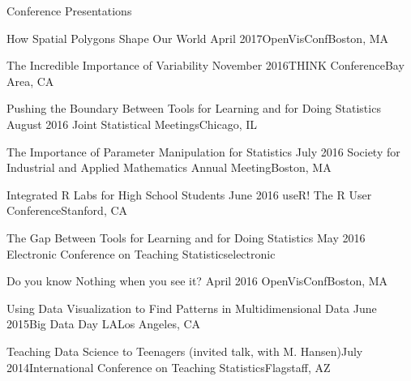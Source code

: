 \documentclass{resume} %
\begin{document}
\begin{rSection}{Conference Presentations}
\begin{sSubsection}{How Spatial Polygons Shape Our World}{ }{April 2017}{OpenVisConf}{Boston, MA}
\end{sSubsection}

\begin{sSubsection}{The Incredible Importance of Variability}{ }{November 2016}{THINK Conference}{Bay Area, CA}
\end{sSubsection}

\begin{sSubsection}{Pushing the Boundary Between Tools for Learning and for Doing Statistics}{ }{August 2016 }{Joint Statistical Meetings}{Chicago, IL}
\end{sSubsection}

\begin{sSubsection}{The Importance of Parameter Manipulation for Statistics}{ }{July 2016 }{Society for Industrial and Applied Mathematics Annual Meeting}{Boston, MA}
\end{sSubsection}

\begin{sSubsection}{Integrated R Labs for High School Students}{ }{June 2016 }{useR! The R User Conference}{Stanford, CA}
\end{sSubsection}

\begin{sSubsection}{The Gap Between Tools for Learning and for Doing Statistics}{ }{May 2016 }{Electronic Conference on Teaching Statistics}{electronic}
\end{sSubsection}

\begin{sSubsection}{Do you know Nothing when you see it?}{ }{April 2016 }{OpenVisConf}{Boston, MA}
\end{sSubsection}

\begin{sSubsection}{Using Data Visualization to Find Patterns in Multidimensional Data}{ }{June 2015}{Big Data Day LA}{Los Angeles, CA}
\end{sSubsection}

\begin{sSubsection}{Teaching Data Science to Teenagers}{ (invited talk, with M. Hansen)}{July 2014}{International Conference on Teaching Statistics}{Flagstaff, AZ}
\end{sSubsection}


\end{rSection}
\end{document}
